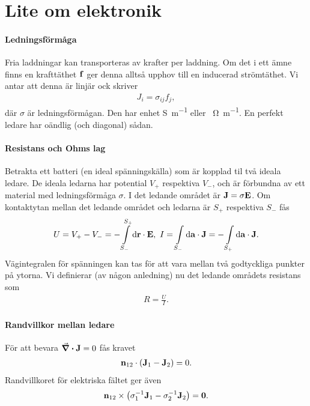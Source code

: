 \section{Lite om elektronik}

\paragraph{Ledningsförmåga}
Fria laddningar kan transporteras av krafter per laddning. Om det i ett ämne finns en krafttäthet $\vb{f}$ ger denna alltså upphov till en inducerad strömtäthet. Vi antar att denna är linjär ock skriver
\begin{align*}
	J_{i} = \sigma_{ij}f_{j},
\end{align*}
där $\sigma$ är ledningsförmågan. Den har enhet \si{\siemens\per\meter} eller \si{\per\ohm\per\meter}. En perfekt ledare har oändlig (och diagonal) sådan.

\paragraph{Resistans och Ohms lag}
Betrakta ett batteri (en ideal spänningskälla) som är kopplad til två ideala ledare. De ideala ledarna har potential $V_{+}$ respektiva $V_{-}$, och är förbundna av ett material med ledningsförmåga $\sigma$. I det ledande området är $\vb{J} = \sigma\vb{E}$. Om kontaktytan mellan det ledande området och ledarna är $S_{+}$ respektiva $S_{-}$ fås
\begin{align*}
	U = V_{+} - V_{-} = -\int\limits_{S_{-}}^{S_{+}}\dd{\vb{\vb{r}}}\cdot \vb{E},\ I = \int\limits_{S_{-}}^{}\dd{\vb{\vb{a}}}\cdot \vb{J} = -\int\limits_{S_{+}}^{}\dd{\vb{\vb{a}}}\cdot \vb{J}.
\end{align*}
Vägintegralen för spänningen kan tas för att vara mellan två godtyckliga punkter på ytorna. Vi definierar (av någon anledning) nu det ledande områdets resistans som
\begin{align*}
	R = \frac{U}{I}.
\end{align*}

\paragraph{Randvillkor mellan ledare}
För att bevara $\div{\vb{J}} = 0$ fås kravet
\begin{align*}
	\vb{n}_{12}\cdot(\vb{J}_{1} - \vb{J}_{2}) = 0.
\end{align*}
Randvillkoret för elektriska fältet ger även
\begin{align*}
	\vb{n}_{12}\times\left(\sigma_{1}^{-1}\vb{J}_{1} - \sigma_{2}^{-1}\vb{J}_{2}\right) = \vb{0}.
\end{align*}

